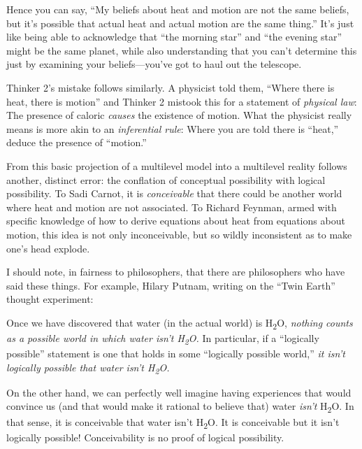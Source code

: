 {
 Hence you can say, ``My beliefs about heat and
motion are not the same beliefs, but it's possible that
actual heat and actual motion are the same thing.''
It's just like being able to acknowledge that
``the morning star'' and
``the evening star'' might be the
same planet, while also understanding that you can't
determine this just by examining your beliefs---you've
got to haul out the telescope.}

{
 Thinker 2's mistake follows similarly. A physicist
told them, ``Where there is heat, there is
motion'' and Thinker 2 mistook this for a statement
of \textit{physical law}: The presence of caloric \textit{causes} the
existence of motion. What the physicist really means is more akin to an
\textit{inferential rule}: Where you are told there is
``heat,'' deduce the presence of
``motion.''}

{
 From this basic projection of a multilevel model into a multilevel
reality follows another, distinct error: the conflation of conceptual
possibility with logical possibility. To Sadi Carnot, it is
\textit{conceivable} that there could be another world where heat and
motion are not associated. To Richard Feynman, armed with specific
knowledge of how to derive equations about heat from equations about
motion, this idea is not only inconceivable, but so wildly inconsistent
as to make one's head explode.}

{
 I should note, in fairness to philosophers, that there are
philosophers who have said these things. For example, Hilary Putnam,
writing on the ``Twin Earth''
thought experiment:}

{
 Once we have discovered that water (in the actual world) is
H\textsubscript{2}O, \textit{nothing counts as a possible world in
which water isn't
H}\textit{\textsubscript{2}}\textit{O.} In particular, if a
``logically possible'' statement is
one that holds in some ``logically possible
world,'' \textit{it isn't logically
possible that water isn't
H}\textit{\textsubscript{2}}\textit{O.}}

{
 On the other hand, we can perfectly well imagine having
experiences that would convince us (and that would make it rational to
believe that) water \textit{isn't} H\textsubscript{2}O.
In that sense, it is conceivable that water isn't
H\textsubscript{2}O. It is conceivable but it isn't
logically possible! Conceivability is no proof of logical possibility.}

